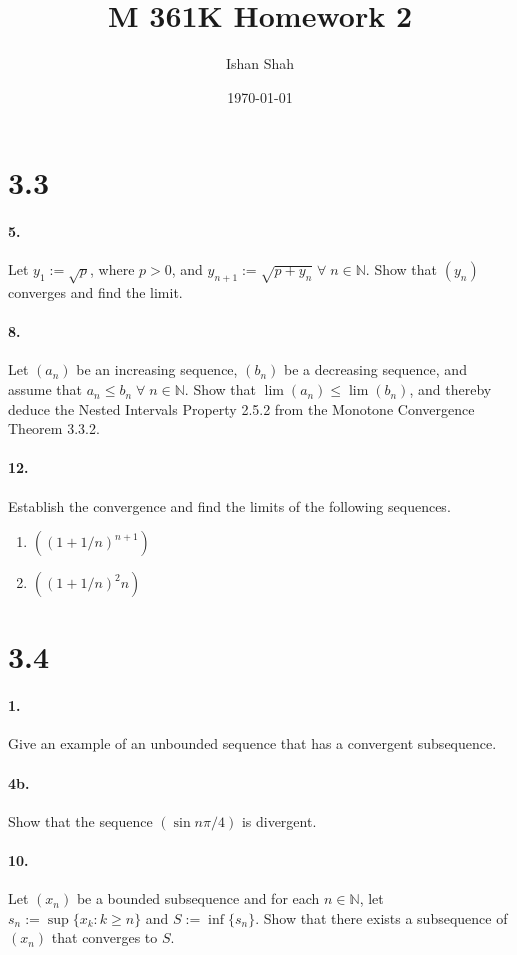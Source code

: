 \documentclass[12pt]{article}
\newcommand\N{\mathbb{N}}
\theoremstyle{remark}
\begin{document}
\title{M 361K Homework 2}
\author{Ishan Shah}
\date{\today}
\maketitle

\section*{3.3}
\paragraph{5.} Let $y_1 := \sqrt{p}$, where $p > 0$, and $y_{n + 1} := \sqrt{p + y_n} \;\forall\; n \in \N$. Show that $(y_n)$ converges and find the limit.

\paragraph{8.} Let $(a_n)$ be an increasing sequence, $(b_n)$ be a decreasing sequence, and assume that $a_n \leq b_n \;\forall\; n \in \N$. Show that $\lim(a_n) \leq \lim(b_n)$, and thereby deduce the Nested Intervals Property 2.5.2 from the Monotone Convergence Theorem 3.3.2.

\paragraph{12.} Establish the convergence and find the limits of the following sequences.
\begin{enumerate}[label=(\alph*)]
    \item $((1 + 1/n)^{n + 1})$
    \item $((1 + 1/n)^2n)$
\end{enumerate}

\section*{3.4}
\paragraph{1.} Give an example of an unbounded sequence that has a convergent subsequence.

\paragraph{4b.}
Show that the sequence $(\sin n\pi/4)$ is divergent.

\paragraph{10.}
Let $(x_n)$ be a bounded subsequence and for each $n \in \N$, let $s_n := \sup\{x_k : k \geq n\}$ and $S := \inf\{s_n\}$. Show that there exists a subsequence of $(x_n)$ that converges to $S$.
\end{document}
